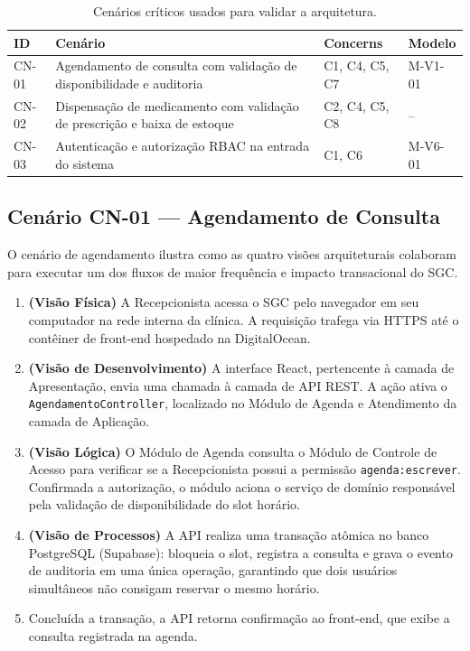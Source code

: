 \begin{table}[htbp]
\caption{Cenários críticos usados para validar a arquitetura.}
\label{tab:cenarios-criticos}
\centering
\small
\begin{tabularx}{\textwidth}{|l|X|l|l|}
\hline
\textbf{ID} & \textbf{Cenário} & \textbf{Concerns} & \textbf{Modelo} \\
\hline
CN-01 & Agendamento de consulta com validação de disponibilidade e auditoria & C1, C4, C5, C7 & M-V1-01 \\
CN-02 & Dispensação de medicamento com validação de prescrição e baixa de estoque & C2, C4, C5, C8 & -- \\
CN-03 & Autenticação e autorização RBAC na entrada do sistema & C1, C6 & M-V6-01 \\
\hline
\end{tabularx}
\end{table}
 
\subsection{Cenário CN-01 — Agendamento de Consulta}
 
O cenário de agendamento ilustra como as quatro visões arquiteturais colaboram para
executar um dos fluxos de maior frequência e impacto transacional do SGC.
 
\begin{enumerate}
    \item \textbf{(Visão Física)} A Recepcionista acessa o SGC pelo navegador em seu
    computador na rede interna da clínica. A requisição trafega via HTTPS até o contêiner
    de front-end hospedado na DigitalOcean.
 
    \item \textbf{(Visão de Desenvolvimento)} A interface React, pertencente à camada de
    Apresentação, envia uma chamada à camada de API REST. A ação ativa o
    \texttt{AgendamentoController}, localizado no Módulo de Agenda e Atendimento da camada
    de Aplicação.
 
    \item \textbf{(Visão Lógica)} O Módulo de Agenda consulta o Módulo de Controle de
    Acesso para verificar se a Recepcionista possui a permissão
    \texttt{agenda:escrever}. Confirmada a autorização, o módulo aciona o serviço de
    domínio responsável pela validação de disponibilidade do slot horário.
 
    \item \textbf{(Visão de Processos)} A API realiza uma transação atômica no banco
    PostgreSQL (Supabase): bloqueia o slot, registra a consulta e grava o evento de
    auditoria em uma única operação, garantindo que dois usuários simultâneos não
    consigam reservar o mesmo horário.
 
    \item Concluída a transação, a API retorna confirmação ao front-end, que exibe a
    consulta registrada na agenda.
\end{enumerate}
 
